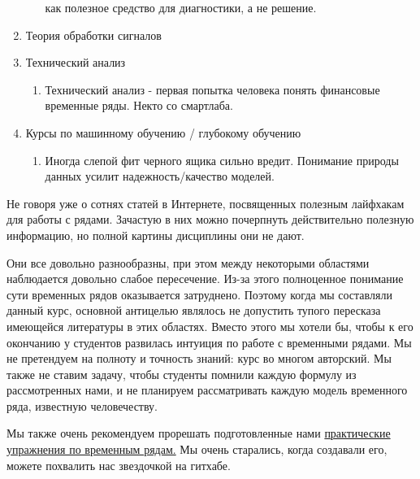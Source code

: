 \begin{enumerate}
\begin{enumerate}
        как полезное средство для диагностики, а не решение.
    \end{enumerate}
  \item Теория обработки сигналов
  \item Технический анализ
    \begin{enumerate}
      \item Технический анализ - первая попытка человека понять финансовые
        временные ряды. Некто со смартлаба.
    \end{enumerate}
  \item Курсы по машинному обучению / глубокому обучению
    \begin{enumerate}
      \item Иногда слепой фит черного ящика сильно вредит. Понимание природы
        данных усилит надежность/качество моделей.
    \end{enumerate}
\end{enumerate}

Не говоря уже о сотнях статей в Интернете, посвященных полезным
лайфхакам для работы с рядами. Зачастую в них можно почерпнуть
действительно полезную информацию, но полной картины дисциплины они не дают.

Они все довольно разнообразны, при этом между некоторыми областями
наблюдается довольно слабое пересечение.
Из-за этого полноценное понимание сути
временных рядов оказывается затруднено. Поэтому когда мы составляли
данный курс, основной антицелью являлось не допустить тупого
пересказа имеющейся литературы в этих областях. Вместо этого мы
хотели бы, чтобы к  его окончанию у студентов развилась интуиция по
работе с временными рядами. Мы не претендуем на полноту и
точность знаний: курс во многом авторский. Мы также не ставим задачу,
чтобы студенты помнили каждую формулу из
рассмотренных нами, и не планируем рассматривать каждую модель
временного ряда, известную человечеству.

Мы также очень рекомендуем прорешать подготовленные нами
\href{https://github.com/IgorEvsin/ts_examples}{практические
упражнения по временным рядам.} Мы очень старались, когда создавали
его, можете похвалить нас звездочкой на гитхабе.
